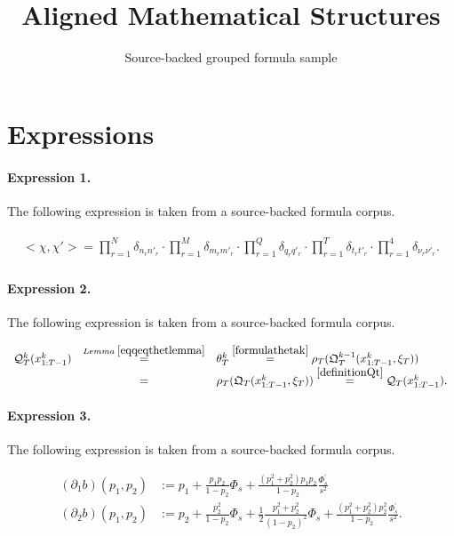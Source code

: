 \documentclass[11pt]{article}
\title{Aligned Mathematical Structures}
\author{Source-backed grouped formula sample}
\date{}
\begin{document}
\maketitle
\section{Expressions}
\paragraph{Expression 1.} The following expression is taken from a source-backed formula corpus.

\begin{align*}\begin{array}{l}<\chi,\chi'>=\displaystyle \prod_{r=1}^{N}\delta_{n_{r}n'_{r}}\cdot\displaystyle \prod_{r=1}^{M}\delta_{m_{r}m'_{r}}\cdot\displaystyle \prod_{r=1}^{Q}\delta_{q_{r}q'_{r}}\cdot\displaystyle \prod_{r=1}^{T}\delta_{t_{r}t'_{r}}\cdot\displaystyle \prod_{r=1}^{4}\delta_{\nu_{r}\nu'_{r}}.\end{array}\end{align*}

\paragraph{Expression 2.} The following expression is taken from a source-backed formula corpus.

\begin{align*}\begin{array}{ccl}\mathcal{Q}_T^k(x_{1:T-1}^k)& \stackrel{Lemma \; \ref{eqqeqthetlemma}}{=} &\theta_T^k \stackrel{\eqref{formulathetak}}{=} \rho_T(\mathfrak{Q}_T^{k-1}(x_{1:T-1}^k, \xi_T))\\&= &\rho_T(\mathfrak{Q}_T(x_{1:T-1}^k, \xi_T)) \stackrel{\eqref{definitionQt}}{=} \mathcal{Q}_T(x_{1:T-1}^k).\end{array}\end{align*}

\paragraph{Expression 3.} The following expression is taken from a source-backed formula corpus.

\begin{align*} (\partial_1 b)(p_1, p_2) &:= p_1 + \frac{p_1 p_2}{1-p_2} \Phi_s + \frac{(p_1^2 + p_2^2) p_1 p_2}{1-p_2} \frac{\Phi_s^\prime}{s^2}\\(\partial_2 b)(p_1, p_2) & := p_2 + \frac{p_2^2}{1-p_2} \Phi_s + \frac{1}{2} \frac{p_1^2 +p_2^2}{(1-p_2)^2} \Phi_s + \frac{(p_1^2+p_2^2) p_2^2}{1-p_2} \frac{\Phi_s^\prime}{s^2}. \end{align*}
\end{document}
